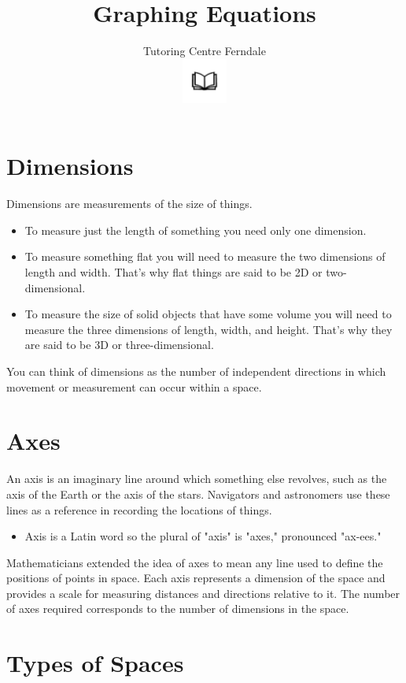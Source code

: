 \documentclass{article}
\title{Graphing Equations}\\
\author{Tutoring Centre Ferndale\\
\includegraphics[width=4em]{ApS_logo.png}}
\date{}\\
\begin{document}
\maketitle

\section*{Dimensions}
Dimensions are measurements of the size of things.
\begin{itemize}
    \item To measure just the length of something you need only one dimension.
    \item To measure something flat you will need to measure the two dimensions of length and width. That's why flat things are said to be 2D or two-dimensional.
    \item To measure the size of solid objects that have some volume you will need to measure the three dimensions of length, width, and height. That's why they are said to be 3D or three-dimensional.
\end{itemize}
You can think of dimensions as the number of independent directions in which movement or measurement can occur within a space.

\section*{Axes}
An axis is an imaginary line around which something else revolves, such as the axis of the Earth or the axis of the stars. Navigators and astronomers use these lines as a reference in recording the locations of things.

\begin{itemize}
    \item Axis is a Latin word so the plural of "axis" is "axes," pronounced "ax-ees."
\end{itemize}

Mathematicians extended the idea of axes to mean any line used to define the positions of points in space. Each axis represents a dimension of the space and provides a scale for measuring distances and directions relative to it. The number of axes required corresponds to the number of dimensions in the space.

\newpage

\section*{Types of Spaces}
\end{document}
